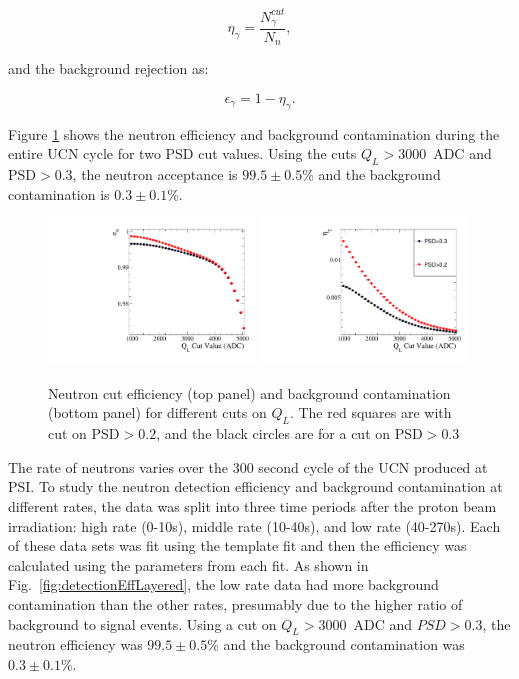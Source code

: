 \documentclass[letter,twocolumn,preprint,3p,numbers,sort&compress]{elsarticle}
\begin{document}
\begin{equation}
\eta_{\gamma}= \frac{N_{\gamma}^{cut}}{N_n},
\end{equation}

\noindent and the background rejection as:

\begin{equation}
\epsilon_{\gamma} = 1 - \eta_{\gamma}.
\end{equation}

\noindent Figure \ref{fig:detectionEff} shows the neutron efficiency
and background contamination during the entire UCN cycle for two
PSD cut values.  Using the cuts $Q_L>3000$~ADC and PSD$>0.3$, the neutron
acceptance is $99.5\pm0.5$\% and the background contamination
is $0.3\pm0.1$\%.


\begin{figure}[!htpb]
\centering \includegraphics[width =0.49\textwidth, angle=0]{figures/neutroneff.pdf}
\centering \includegraphics[width =0.49\textwidth, angle=0]{figures/backgroundconta.pdf}
\caption{ Neutron cut efficiency (top panel) and background
  contamination (bottom panel) for different cuts on $Q_L$.  The red
  squares are with cut on PSD$>0.2$, and the black circles are for a
  cut on PSD$>0.3$ }
\label{fig:detectionEff}
\end{figure}

The rate of neutrons varies over the 300 second cycle of the UCN
produced at PSI.  To study the neutron detection efficiency and
background contamination at different rates, the data was split into
three time periods after the proton beam irradiation: high rate
(0-10s), middle rate (10-40s), and low rate (40-270s).  Each of these
data sets was fit using the template fit and then the efficiency was
calculated using the parameters from each fit.  As shown in
Fig.~\ref{fig:detectionEffLayered}, the low rate data had more
background contamination than the other rates, presumably due to the
higher ratio of background to signal events.  Using a cut on $Q_L >
3000$~ADC and $PSD>0.3$, the neutron efficiency was $99.5\pm0.5$\% and
the background contamination was $0.3\pm0.1$\%.
\end{document}
